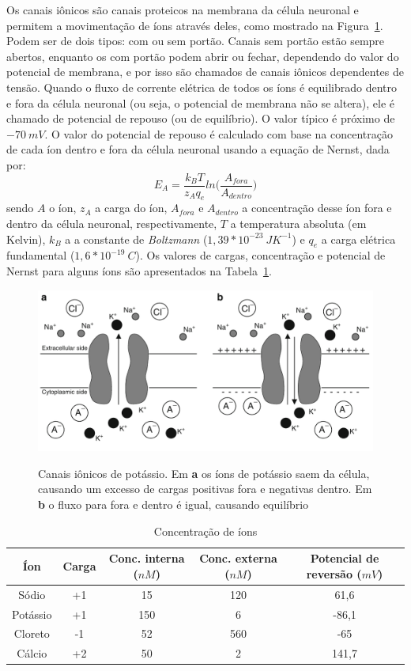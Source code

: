 Os canais iônicos são canais proteicos na membrana da célula neuronal e permitem a movimentação de íons através deles, como mostrado na Figura~\ref{fig:canaisions}. Podem ser de dois tipos: com ou sem portão. Canais sem portão estão sempre abertos, enquanto os com portão podem abrir ou fechar, dependendo do valor do potencial de membrana, e por isso são chamados de canais iônicos dependentes de tensão. Quando o fluxo de corrente elétrica de todos os íons é equilibrado dentro e fora da célula neuronal (ou seja, o potencial de membrana não se altera), ele é chamado de potencial de repouso (ou de equilíbrio). O valor típico é próximo de $-70\ mV$. O valor do potencial de repouso é calculado com base na concentração de cada íon dentro e fora da célula neuronal usando a equação de Nernst, dada por:
\begin{equation}\label{eq:nernst}
E_A=\frac{k_BT}{z_Aq_e}ln\Big(\frac{A_{fora}}{A_{dentro}}\Big)
\end{equation}
sendo $A$ o íon, $z_A$ a carga do íon, $A_{fora}$ e $A_{dentro}$ a concentração desse íon fora e dentro da célula neuronal, respectivamente, $T$ a temperatura absoluta (em Kelvin), $k_B$ a a constante de \textit{Boltzmann} ($1,39*10^{-23}\ JK^{-1}$) e $q_e$ a carga elétrica fundamental ($1,6*10^{-19}\ C$). Os valores de cargas, concentração e potencial de Nernst para alguns íons são apresentados na Tabela~\ref{tab:concentracao_nernst}.

\begin{figure}[tb!]
	\centering
	\caption[Canais iônicos de potássio]{Canais iônicos de potássio. Em \textbf{a} os íons de potássio saem da célula, causando um excesso de cargas positivas fora e negativas dentro. Em \textbf{b} o fluxo para fora e dentro é igual, causando equilíbrio}
	\label{fig:canaisions}
	\includegraphics[width=0.7\linewidth]{figs/canais_ions}
	\\
	\cite{ermentrout_mathematical_2010}
\end{figure}

\begin{table}
	\centering
	\caption[Concentração de íons]{Concentração de íons}
	\label{tab:concentracao_nernst}
	\begin{tabular}{c|c|c|c|c}
		\hline
		Íon & Carga & Conc. interna ($nM$) & Conc. externa ($nM$) & Potencial de reversão ($mV$) \\
		\hline
		Sódio & +1 & 15 & 120 & 61,6 \\
		\hline
		Potássio & +1 & 150 & 6 & -86,1 \\
		\hline
		Cloreto & -1 & 52 & 560 & -65 \\
		\hline
		Cálcio & +2 & 50 & 2 & 141,7 \\
		\hline
	\end{tabular}
\end{table}

